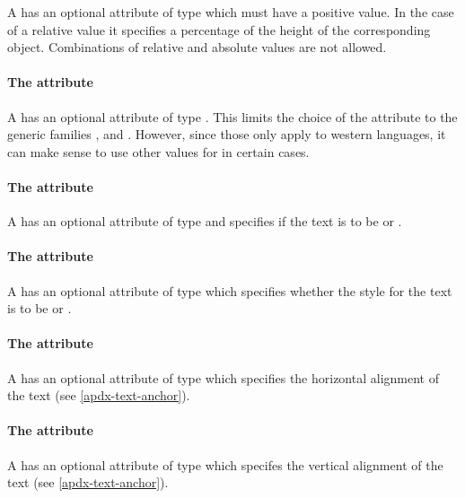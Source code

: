 A \Text has an optional attribute  of type \RelAbsVector which must have a positive value. In the case of a relative value it specifies a percentage of the
height of the corresponding object. Combinations of relative and absolute values are not allowed.


\paragraph{The \fixttspace{} attribute}

A \Text has an optional attribute  of type
\FontFamily.  This limits the 
choice of the  attribute to the generic families , 
and . However, since those only apply to western languages, it can make
sense to use other values for  in certain cases.

\paragraph{The \fixttspace{} attribute}

A \Text has an optional attribute  of type
\FontWeight and specifies if the text is to be  or .

\paragraph{The \fixttspace{} attribute}

A \Text has an optional attribute  of type \FontStyle which specifies whether the style for the text is to be  or .

\paragraph{The \fixttspace{} attribute}

A \Text has an optional attribute  of type
\HTextAnchor which specifies the horizontal alignment of the text (see \ref{apdx-text-anchor}).

\paragraph{The \fixttspace{} attribute}

A \Text has an optional attribute  of type
\VTextAnchor which specifes the vertical alignment of the text (see \ref{apdx-text-anchor}).

